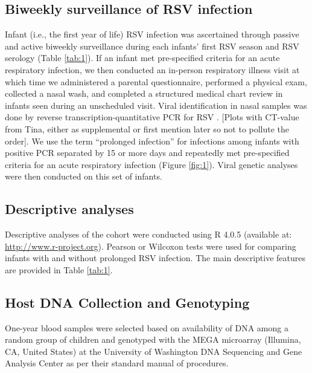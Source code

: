 \documentclass{article} %
\begin{document}
\subsection{Biweekly surveillance of RSV infection}
Infant (i.e., the first year of life) RSV infection was ascertained through passive and active biweekly surveillance during each infants' first RSV season and RSV serology
(Table \ref{tab:1}).
If an infant met pre-specified criteria for an acute respiratory infection, we then conducted an in-person respiratory illness visit at which time we administered a parental questionnaire, performed a physical exam, collected a nasal wash, and completed a structured medical chart review in infants seen during an unscheduled visit. 
Viral identification in nasal samples was done by reverse transcription-quantitative PCR for RSV
\cite{larkin2015objectives}. 
[Plots with CT-value from Tina, either as supplemental or first mention later so not to pollute the order]. 
We use the term “prolonged infection” for infections among infants with positive PCR separated by 15 or more days and repeatedly met pre-specified criteria for an acute respiratory infection 
(Figure \ref{fig:1}).
Viral genetic analyses were then conducted on this set of infants.

\subsection{Descriptive analyses}
Descriptive analyses of the cohort were conducted using R 4.0.5 (available at: 
\url{http://www.r-project.org}). 
Pearson or Wilcoxon tests were used for comparing infants with and without prolonged RSV infection.
The main descriptive features are provided in 
Table \ref{tab:1}.

\subsection{Host DNA Collection and Genotyping}
One-year blood samples were selected based on availability of DNA among a random group of children and genotyped with the MEGA microarray (Illumina, CA, United States) at the University of Washington DNA Sequencing and Gene Analysis Center as per their standard manual of procedures.
\end{document}

